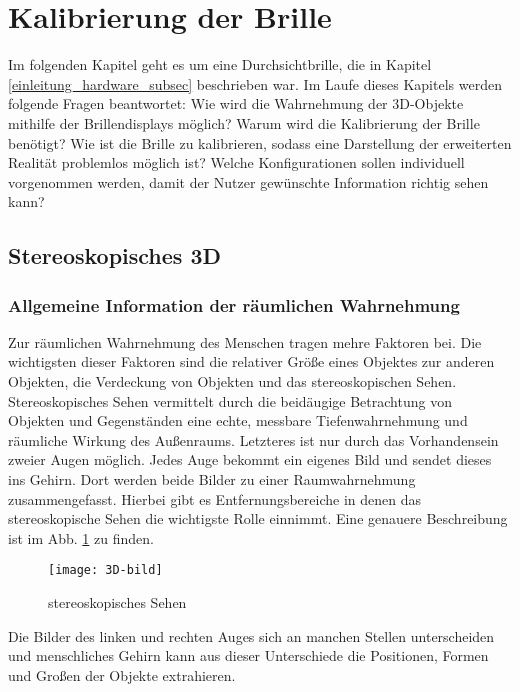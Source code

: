 \section{Kalibrierung der Brille}
Im folgenden Kapitel geht es um eine Durchsichtbrille, die in Kapitel \ref{einleitung_hardware_subsec}  beschrieben war.
 Im Laufe dieses Kapitels werden folgende Fragen beantwortet: 
Wie wird die Wahrnehmung der 3D-Objekte mithilfe der Brillendisplays möglich?
Warum wird die Kalibrierung der Brille benötigt? 
Wie ist die Brille zu kalibrieren, sodass eine Darstellung der erweiterten Realität problemlos möglich ist? 
Welche Konfigurationen sollen individuell vorgenommen werden, damit der Nutzer gewünschte Information richtig sehen kann? 

\subsection{Stereoskopisches 3D}
\label{sec:Stereoskopisches 3D}
\subsubsection{Allgemeine Information der räumlichen Wahrnehmung}
Zur räumlichen Wahrnehmung des Menschen tragen mehre Faktoren bei.
Die wichtigsten dieser Faktoren sind die relativer Größe eines Objektes zur anderen Objekten, die Verdeckung von Objekten und das stereoskopischen Sehen. 
Stereoskopisches Sehen vermittelt durch die beidäugige Betrachtung von Objekten und Gegenständen eine echte, messbare Tiefenwahrnehmung und räumliche Wirkung des Außenraums. 
Letzteres ist nur durch das Vorhandensein zweier Augen möglich.
Jedes Auge bekommt ein eigenes Bild und sendet dieses ins Gehirn.
Dort werden beide Bilder zu einer Raumwahrnehmung zusammengefasst.
Hierbei gibt es Entfernungsbereiche in denen das stereoskopische Sehen die wichtigste Rolle einnimmt.
Eine genauere Beschreibung ist im Abb. \ref{fig:3D} zu finden.

\begin{figure}[h]
   \centering
   \texttt{[image: 3D-bild]}
   \caption{stereoskopisches Sehen}
   \label{fig:3D}
\end{figure}

Die Bilder des linken und rechten Auges sich an manchen Stellen unterscheiden und menschliches Gehirn kann aus dieser Unterschiede die Positionen, Formen und Großen der Objekte extrahieren.

